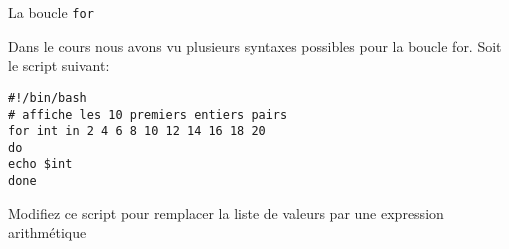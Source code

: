 \begin{exercice}
  \begin{exercicelet}{La boucle \texttt{for}}
    \begin{questions}
    \item Dans le cours nous avons vu plusieurs syntaxes possibles pour la boucle for. Soit le script suivant:
      \begin{minipage}[c]{5cm}
\begin{verbatim}
#!/bin/bash
# affiche les 10 premiers entiers pairs
for int in 2 4 6 8 10 12 14 16 18 20
do
echo $int
done   
\end{verbatim}
      \end{minipage}

    \item Modifiez ce script pour remplacer la liste de valeurs par une expression arithmétique

    \end{questions}
  \end{exercicelet}
\end{exercice}

